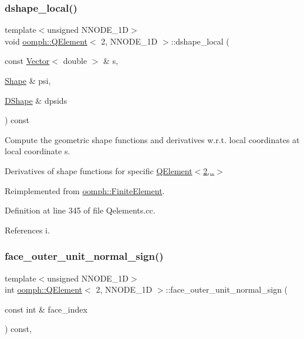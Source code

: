 \subsubsection{\texorpdfstring{dshape\+\_\+local()}{dshape\_local()}}
{\footnotesize\ttfamily template$<$unsigned N\+N\+O\+D\+E\+\_\+1D$>$ \\
void \hyperlink{classoomph_1_1QElement}{oomph\+::\+Q\+Element}$<$ 2, N\+N\+O\+D\+E\+\_\+1D $>$\+::dshape\+\_\+local (\begin{DoxyParamCaption}\item[{const \hyperlink{classoomph_1_1Vector}{Vector}$<$ double $>$ \&}]{s,  }\item[{\hyperlink{classoomph_1_1Shape}{Shape} \&}]{psi,  }\item[{\hyperlink{classoomph_1_1DShape}{D\+Shape} \&}]{dpsids }\end{DoxyParamCaption}) const\hspace{0.3cm}{\ttfamily [virtual]}}



Compute the geometric shape functions and derivatives w.\+r.\+t. local coordinates at local coordinate s. 

Derivatives of shape functions for specific \hyperlink{classoomph_1_1QElement_3_012_00_01NNODE__1D_01_4_a6437dbbbf374520208a72e1b1b57cf04}{Q\+Element$<$2,..$>$} 

Reimplemented from \hyperlink{classoomph_1_1FiniteElement_a9db1456b827131c21a991ac9fedf4b0c}{oomph\+::\+Finite\+Element}.



Definition at line 345 of file Qelements.\+cc.



References i.

\mbox{\label{classoomph_1_1QElement_3_012_00_01NNODE__1D_01_4_ae1a3c4a69728998d8f4484e06ecd52a4}} 
\subsubsection{\texorpdfstring{face\+\_\+outer\+\_\+unit\+\_\+normal\+\_\+sign()}{face\_outer\_unit\_normal\_sign()}}
{\footnotesize\ttfamily template$<$unsigned N\+N\+O\+D\+E\+\_\+1D$>$ \\
int \hyperlink{classoomph_1_1QElement}{oomph\+::\+Q\+Element}$<$ 2, N\+N\+O\+D\+E\+\_\+1D $>$\+::face\+\_\+outer\+\_\+unit\+\_\+normal\+\_\+sign (\begin{DoxyParamCaption}\item[{const int \&}]{face\+\_\+index }\end{DoxyParamCaption}) const\hspace{0.3cm}{\ttfamily [inline]}, {\ttfamily [virtual]}}



